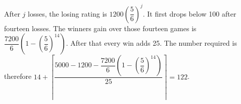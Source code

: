 After $j$ losses, the losing rating is $1200(\dfrac{5}{6})^j$. It first drops below 100 after fourteen losses. The winner\textquotesingle s gain over those fourteen games is $\dfrac{7200}{6}(1-(\dfrac{5}{6})^{14})$. After that every win adds 25. The number required is therefore $14+\left\lceil\dfrac{5000-1200-\dfrac{7200}{6}(1-(\dfrac{5}{6})^{14})}{25}\right\rceil=\boxed{122}$.
